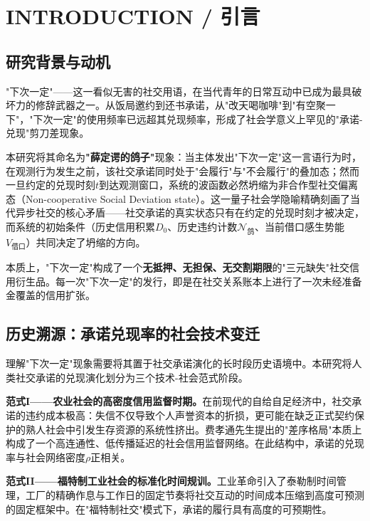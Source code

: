 \documentclass[journal]{IEEEtran}
\newcommand{\citet}[1]{\cite{#1}}
\begin{document}
\IEEEpeerreviewmaketitle

\section{INTRODUCTION / 引言}

\subsection{研究背景与动机}

"下次一定"——这一看似无害的社交用语，在当代青年的日常互动中已成为最具破坏力的修辞武器之一。从饭局邀约到还书承诺，从"改天喝咖啡"到"有空聚一下"，"下次一定"的使用频率已远超其兑现频率，形成了社会学意义上罕见的"承诺-兑现"剪刀差现象\citet{pigeon_linguistics}。

本研究将其命名为\textbf{"薛定谔的鸽子"}现象：当主体发出"下次一定"这一言语行为时，在观测行为发生之前，该社交承诺同时处于"会履行"与"不会履行"的叠加态；然而一旦约定的兑现时刻$t$到达观测窗口，系统的波函数必然坍缩为非合作型社交偏离态（Non-cooperative Social Deviation state）。这一量子社会学隐喻精确刻画了当代异步社交的核心矛盾——社交承诺的真实状态只有在约定的兑现时刻才被决定，而系统的初始条件（历史信用积累$D_0$、历史违约计数$\mathcal{N}_{\text{鸽}}$、当前借口感生势能$V_{\text{借口}}$）共同决定了坍缩的方向\citet{schrodinger_vs_pigeon}。

本质上，"下次一定"构成了一个\textbf{无抵押、无担保、无交割期限}的"三元缺失"社交信用衍生品\citet{ponzi_social}。每一次"下次一定"的发行，即是在社交关系账本上进行了一次未经准备金覆盖的信用扩张。

\subsection{历史溯源：承诺兑现率的社会技术变迁}

理解"下次一定"现象需要将其置于社交承诺演化的长时段历史语境中。本研究将人类社交承诺的兑现演化划分为三个技术-社会范式阶段。

\textbf{范式I——农业社会的高密度信用监督时期。}在前现代的自给自足经济中，社交承诺的违约成本极高：失信不仅导致个人声誉资本的折损，更可能在缺乏正式契约保护的熟人社会中引发生存资源的系统性挤出。费孝通先生提出的"差序格局"\citet{guanxi}本质上构成了一个高连通性、低传播延迟的社会信用监督网络。在此结构中，承诺的兑现率与社会网络密度$\rho$正相关。

\textbf{范式II——福特制工业社会的标准化时间规训。}工业革命引入了泰勒制时间管理，工厂的精确作息与工作日的固定节奏将社交互动的时间成本压缩到高度可预测的固定框架中。在"福特制社交"模式下，承诺的履行具有高度的可预期性。
\end{document}
